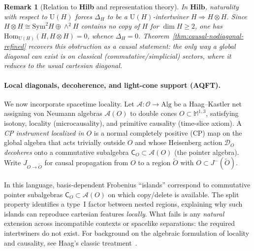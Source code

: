 \documentclass[11pt]{article}
\theoremstyle{upright}
\newtheorem{remark}{Remark}
\begin{document}
\begin{remark}[Relation to \textbf{Hilb} and representation theory]
In $\mathbf{Hilb}$, naturality with respect to $\mathrm{U}(H)$ forces $\Delta_H$ to be a $\mathrm{U}(H)$-intertwiner $H\Rightarrow H\otimes H$. Since $H\otimes H\cong \mathrm{Sym}^2 H\oplus \wedge^2 H$ contains no copy of $H$ for $\dim H\ge 2$, one has $\mathrm{Hom}_{\mathrm{U}(H)}(H,H\otimes H)=0$, whence $\Delta_H=0$. Theorem~\ref{thm:causal-nodiagonal-refined} recovers this obstruction as a \emph{causal} statement: the only way a global diagonal can exist is on classical (commutative/simplicial) sectors, where it reduces to the usual cartesian diagonal.
\end{remark}

\paragraph{Local diagonals, decoherence, and light-cone support (AQFT).}
We now incorporate spacetime locality. Let $\mathcal{A}:\mathcal{O}\to\mathrm{Alg}$ be a Haag--Kastler net~\cite{HaagKastler1964} assigning von Neumann algebras $\mathcal{A}(O)$ to double cones $O\subset \mathbb{M}^{1,3}$, satisfying isotony, locality (microcausality), and primitive causality (time-slice axiom). A \emph{CP instrument localized in $O$} is a normal completely positive (CP) map on the global algebra that acts trivially outside $O$ and whose Heisenberg action $\mathcal{D}_O$ \emph{decoheres} onto a commutative subalgebra $\mathsf{C}_O\subset \mathcal{A}(O)$ (the pointer algebra). Write $J_{O\to \tilde O}$ for causal propagation from $O$ to a region $\tilde O$ with $O\subset J^-(\tilde O)$.

\paragraph{}
In this language, basis-dependent Frobenius ``islands'' correspond to commutative pointer subalgebras $\mathsf{C}_O\subset\mathcal{A}(O)$ on which copy/delete is available. The split property identifies a type~I factor between nested regions, explaining why such islands can reproduce cartesian features \emph{locally}. What fails is any \emph{natural} extension across incompatible contexts or spacelike separations: the required intertwiners do not exist. For background on the algebraic formulation of locality and causality, see Haag’s classic treatment~\cite{Haag1992}.
\end{document}
